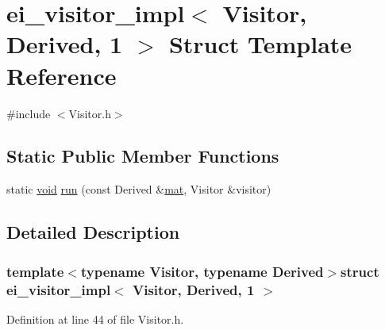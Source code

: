 \hypertarget{structei__visitor__impl_3_01_visitor_00_01_derived_00_011_01_4}{\section{ei\-\_\-visitor\-\_\-impl$<$ Visitor, Derived, 1 $>$ Struct Template Reference}
\label{structei__visitor__impl_3_01_visitor_00_01_derived_00_011_01_4}
}


{\ttfamily \#include $<$Visitor.\-h$>$}

\subsection*{Static Public Member Functions}
\begin{DoxyCompactItemize}
\item 
static \hyperlink{group___u_a_v_objects_plugin_ga444cf2ff3f0ecbe028adce838d373f5c}{void} \hyperlink{structei__visitor__impl_3_01_visitor_00_01_derived_00_011_01_4_aa6ee8f5369e7a6f81da88e13c95dee56}{run} (const Derived \&\hyperlink{uavobjecttemplate_8m_a16a51e808b16c46bbfd36da2e37cd123}{mat}, Visitor \&visitor)
\end{DoxyCompactItemize}


\subsection{Detailed Description}
\subsubsection*{template$<$typename Visitor, typename Derived$>$struct ei\-\_\-visitor\-\_\-impl$<$ Visitor, Derived, 1 $>$}



Definition at line 44 of file Visitor.\-h.



